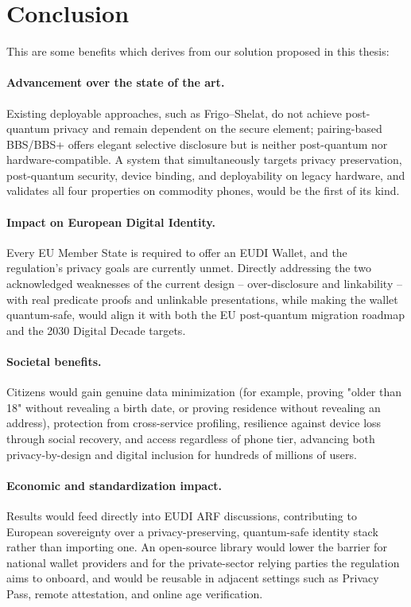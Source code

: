 \documentclass{article}
\begin{document}
\section{Conclusion}
\label{sec:conclusion}

This are some benefits which derives from our solution proposed in this thesis:

\paragraph{Advancement over the state of the art.} Existing deployable approaches, such as Frigo--Shelat, do not achieve post-quantum privacy and remain dependent on the secure element; pairing-based BBS/BBS+ offers elegant selective disclosure but is neither post-quantum nor hardware-compatible. A system that simultaneously targets privacy preservation, post-quantum security, device binding, and deployability on legacy hardware, and validates all four properties on commodity phones, would be the first of its kind.
\paragraph{Impact on European Digital Identity.} Every EU Member State is required to offer an EUDI Wallet, and the regulation's privacy goals are currently unmet. Directly addressing the two acknowledged weaknesses of the current design -- over-disclosure and linkability -- with real predicate proofs and unlinkable presentations, while making the wallet quantum-safe, would align it with both the EU post-quantum migration roadmap and the 2030 Digital Decade targets.
\paragraph{Societal benefits.} Citizens would gain genuine data minimization (for example, proving "older than 18" without revealing a birth date, or proving residence without revealing an address), protection from cross-service profiling, resilience against device loss through social recovery, and access regardless of phone tier, advancing both privacy-by-design and digital inclusion for hundreds of millions of users.
\paragraph{Economic and standardization impact.} Results would feed directly into EUDI ARF discussions, contributing to European sovereignty over a privacy-preserving, quantum-safe identity stack rather than importing one. An open-source library would lower the barrier for national wallet providers and for the private-sector relying parties the regulation aims to onboard, and would be reusable in adjacent settings such as Privacy Pass, remote attestation, and online age verification.
\end{document}
